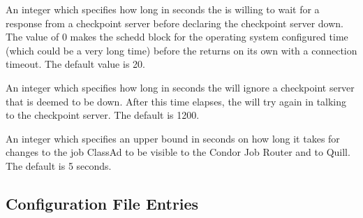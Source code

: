 \begin{description}
\label{param:CkptServerClientTimeout}
\item[\Macro{CKPT\_SERVER\_CLIENT\_TIMEOUT}]
  An integer which specifies how long in seconds the  is
  willing to wait for a response from a checkpoint server before declaring
  the checkpoint server down. The value of 0 makes the schedd block for
  the operating system configured time (which could be a very long time)
  before the  returns on its own with a connection timeout.
  The default value is 20.

\label{param:CkptServerClientTimeoutRetry}
\item[\Macro{CKPT\_SERVER\_CLIENT\_TIMEOUT\_RETRY}]
  An integer which specifies how long in seconds the  will
  ignore a checkpoint server that is deemed to be down. After this time
  elapses, the  will try again in talking to the checkpoint
  server.
  The default is 1200.

\label{param:ScheddJobQueueLogFlushDelay}
\item[\Macro{SCHEDD\_JOB\_QUEUE\_LOG\_FLUSH\_DELAY}]
  An integer which specifies an upper bound in seconds on how long it
  takes for changes to the job ClassAd to be visible to the Condor Job Router
  and to Quill.  The default is 5 seconds.

\end{description}

\subsection{\label{sec:Shadow-Config-File-Entries}
Configuration File Entries}


